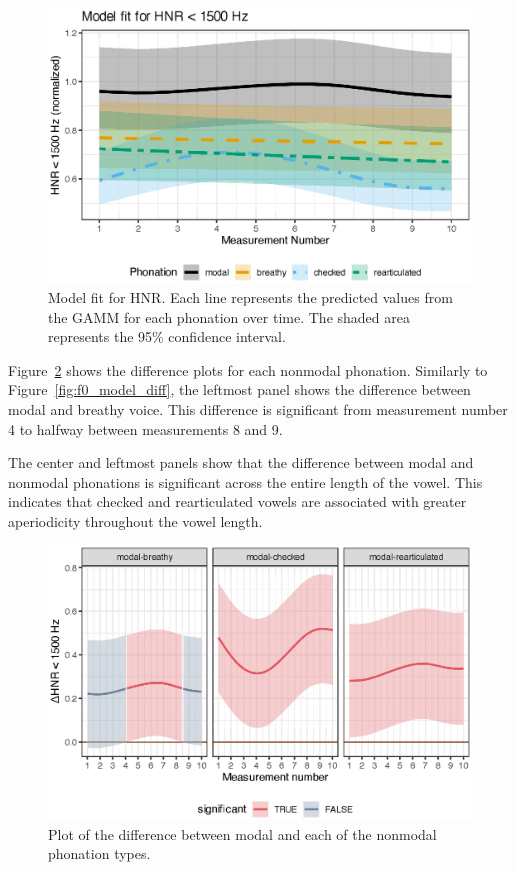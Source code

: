 \begin{figure}[h!]
    \centering
    \includegraphics[width = \linewidth]{images/LCH_GAMMs/hnr15_model_fit.eps}
    \caption{Model fit for HNR. Each line represents the predicted values from the GAMM for each phonation over time. The shaded area represents the 95\% confidence interval.}
    \label{fig:hnr_model_fit}
\end{figure}  

Figure~\ref{fig:hnr_model_diff} shows the difference plots for each nonmodal phonation. Similarly to Figure~\ref{fig:f0_model_diff}, the leftmost panel shows the difference between modal and breathy voice. This difference is significant from measurement number 4 to halfway between measurements 8 and 9. 

The center and leftmost panels show that the difference between modal and nonmodal phonations is significant across the entire length of the vowel. This indicates that checked and rearticulated vowels are associated with greater aperiodicity throughout the vowel length.

\begin{figure}[h!]
    \centering
    \includegraphics[width = \linewidth]{images/LCH_GAMMs/hnr15_model_diff.eps}
    \caption{Plot of the difference between modal and each of the nonmodal phonation types.}
    \label{fig:hnr_model_diff}
\end{figure}

